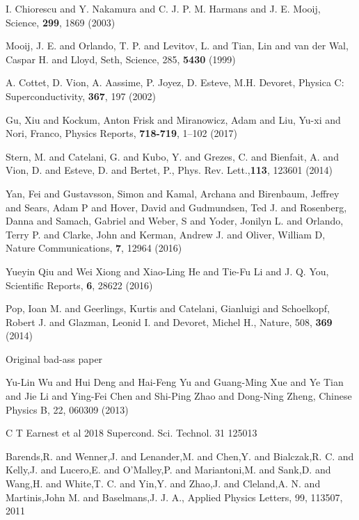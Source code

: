 \begin{thebibliography}{99}
  {I.  Chiorescu  and Y.   Nakamura  and C.   J.  P.   M.  Harmans  and
    J. E. Mooij}, {Science}, \textbf{299}, 1869 (2003)

 {Mooij, J. E. and Orlando, T. P. and Levitov, L. and Tian, Lin and van der
    Wal, Caspar H.  and Lloyd, Seth}, {Science}, 285, \textbf{5430} (1999)
	
 A.  Cottet, D.  Vion, A.   Aassime, P.  Joyez, D.  Esteve, M.H.  Devoret,
  Physica C: Superconductivity, \textbf{367}, 197 (2002)

 Gu, Xiu and Kockum, Anton Frisk and Miranowicz, Adam and Liu, Yu-xi and Nori,
  Franco, Physics Reports, \textbf{718-719}, 1--102 (2017)

 Stern, M. and Catelani, G.  and  Kubo, Y. and Grezes, C.  and Bienfait, A.
  and Vion, D.  and Esteve, D.  and Bertet, P., Phys. Rev. Lett.,\textbf{113}, 123601 (2014)

 Yan, Fei and Gustavsson, Simon and Kamal, Archana and Birenbaum, Jeffrey and
  Sears, Adam  P and  Hover, David  and Gudmundsen, Ted  J. and  Rosenberg, Danna  and Samach,
  Gabriel and  Weber, S and  Yoder, Jonilyn L.   and Orlando, Terry  P.  and Clarke,  John and
  Kerman, Andrew J.  and Oliver, William D, Nature Communications, \textbf{7}, 12964 (2016)

 Yueyin  Qiu and Wei  Xiong and Xiao-Ling  He and Tie-Fu  Li and J.   Q. You,
  Scientific Reports, \textbf{6}, 28622 (2016)

 Pop, Ioan  M. and Geerlings, Kurtis and Catelani,  Gianluigi and Schoelkopf,
  Robert J. and Glazman, Leonid I. and Devoret, Michel H., Nature, 508, \textbf{369} (2014)

 Original bad-ass paper


 {Yu-Lin Wu  and Hui Deng and Hai-Feng  Yu and Guang-Ming Xue and  Ye Tian and
    Jie Li  and Ying-Fei  Chen and Shi-Ping  Zhao and Dong-Ning  Zheng}, {Chinese  Physics B},
  {22}, {060309} (2013)

 C T Earnest et al 2018 Supercond. Sci. Technol. 31 125013
  
  {Barends,R.    and  Wenner,J.    and  Lenander,M.   and   Chen,Y.   and
    Bialczak,R.   C.  and  Kelly,J.  and  Lucero,E.  and  O'Malley,P.  and  Mariantoni,M.  and
    Sank,D.  and Wang,H.  and  White,T.  C.  and Yin,Y.  and Zhao,J.   and Cleland,A.  N.  and
    Martinis,John M. and Baselmans,J.  J. A.}, {Applied Physics Letters}, 99, {113507}, {2011}


\end{thebibliography}
